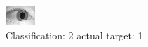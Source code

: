 \begin{figure}[h!]
\begin{center}
\includegraphics[width=0.60\columnwidth]{figures/ID1435_class_2_target_1.png}
\end{center}
\caption{ Classification: 2 actual target: 1}
\label{fig:ID1435_class_2_target_1}
\end{figure}
